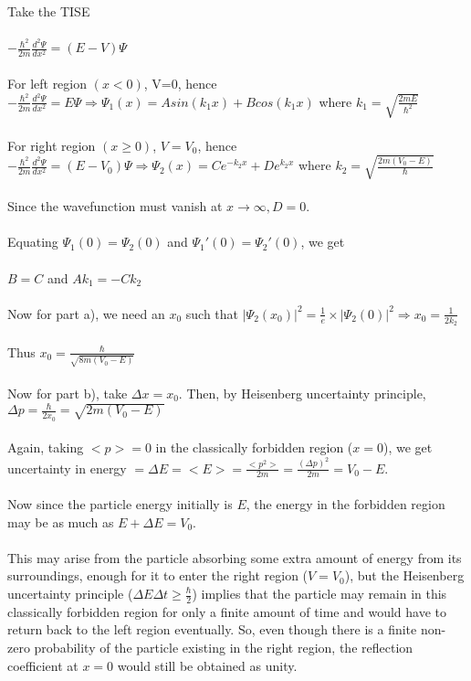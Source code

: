 \documentclass{article}
\begin{document}
Take the TISE\\\\\(-\frac{\hbar^2}{2m}\frac{d^2\Psi}{dx^2} = (E-V)\Psi\)\\\\For left region \((x<0)\), V=0, hence \(-\frac{\hbar^2}{2m}\frac{d^2\Psi}{dx^2} = E\Psi \Rightarrow \Psi _1(x) = Asin(k_1x) + Bcos(k_1x)\) where \(k_1 = \sqrt{\frac{2mE}{\hbar^2}}\)\\\\
For right region \((x\geq0)\), \(V=V_0\), hence \(-\frac{\hbar^2}{2m}\frac{d^2\Psi}{dx^2} = (E-V_0)\Psi \Rightarrow \Psi _2(x)= Ce^{-k_2x} + De^{k_2x}\) where \(k_2 = \sqrt{\frac{2m(V_0 - E)}{\hbar}}\)\\\\
Since the wavefunction must vanish at \(x\rightarrow \infty, D=0.\)\\\\
Equating \(\Psi_1(0) = \Psi_2(0)\) and \(\Psi_1'(0) = \Psi_2'(0)\), we get\\\\\(B=C\) and \(Ak_1 = -Ck_2\)\\\\
Now for part a), we need an \(x_0\) such that \(|\Psi_2(x_0)|^2 = \frac{1}{e}\times |\Psi_2(0)|^2 \Rightarrow x_0=\frac{1}{2k_2}\)\\\\Thus \(x_0 = \frac{\hbar}{\sqrt{8m(V_0-E)}}\)\\\\Now for part b), take \(\Delta x = x_0\). Then, by Heisenberg uncertainty principle, \(\Delta p = \frac{\hbar}{2x_0} = \sqrt{2m(V_0-E)}\)\\\\Again, taking \(<p> = 0\) in the classically forbidden region (\(x=0\)), we get uncertainty in energy \(= \Delta E = <E> = \frac{<p^2>}{2m} = \frac{(\Delta p)^2}{2m} = V_0 - E.\)\\\\Now since the particle energy initially is \(E\), the energy in the forbidden region may be as much as \(E + \Delta E = V_0\).\\\\This may arise from the particle absorbing some extra amount of energy from its surroundings, enough for it to enter the right region (\(V=V_0\)), but the Heisenberg uncertainty principle (\(\Delta E \Delta t \geq \frac{\hbar}{2}\)) implies that the particle may remain in this classically forbidden region for only a finite amount of time and would have to return back to the left region eventually. So, even though there is a finite non-zero probability of the particle existing in the right region, the reflection coefficient at \(x=0\) would still be obtained as unity.
\end{document}
